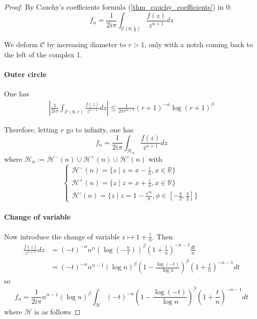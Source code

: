 \documentclass[../main.tex]{subfiles}
\begin{document}
\begin{proof}
	By Cauchy's coefficients formula (\ref{thm_cauchy_coefficients}) in 0:
	\[
	f_n = \frac{1}{2i\pi} \int_{\mathcal{C} \left(0, \frac{1}{2}\right)} \frac{f(z)}{z^{n+1}} dz
	\]
	
	We deform $\mathcal{C}$ by increasing diameter to $r > 1$, only with a notch coming back to the left of the complex 1.
	
	
	\paragraph{Outer circle}
	One has
	\begin{align*}
		\left| \frac{1}{2i\pi} \int_{\mathcal{C}(0, r)} \frac{f(z)}{z^{n+1}} dz \right| \leq
		\frac{1}{2 \pi r^{n + 1}} {(r + 1)}^{-\alpha} {\log (r + 1)}^\beta
	\end{align*}
	
	Therefore, letting $r$ go to infinity, one has
	\[
	f_n = \frac{1}{2i\pi} \int_{\mathcal{H}_n} \frac{f(z)}{z^{n+1}} dz
	\]
	where $\mathcal{H}_n := \mathcal{H}^-(n) \cup \mathcal{H}^+(n) \cup \mathcal{H}^\circ(n)$ with
	\begin{equation*}
		\begin{cases}
		\mathcal{H}^-(n) = \{z \mid z = x - \frac{i}{n}, x \in \mathbb{R} \}\\
		\mathcal{H}^+(n) = \{z \mid z = x + \frac{i}{n}, x \in \mathbb{R} \}\\
		\mathcal{H}^\circ(n) = \{z \mid z = 1 - \frac{e^{i \phi}}{n}, \phi \in [ - \frac{\pi}{2}, \frac{\pi}{2} ] \}
		\end{cases}
	\end{equation*}
	
	\paragraph{Change of variable}	
	Now introduce the change of variable $z \mapsto 1 + \frac{t}{n}$.
	Then
	\begin{align*}
	\frac{f(z)}{z^{n+1}} dz
	&= {(-t)}^{-\alpha} n^\alpha {\left( \log \left( - \frac{n}{t} \right) \right) }^\beta {\left( 1 + \frac{t}{n} \right)}^{-n-1} \frac{dt}{n}\\
	&= {(-t)}^{-\alpha} n^{\alpha-1} {(\log n)}^\beta {\left( 1 - \frac{\log (-t)}{\log n} \right)}^\beta  {\left( 1 + \frac{t}{n} \right)}^{-n-1} dt
	\end{align*}
	so
	\begin{equation*}
		f_n = \frac{1}{2i\pi} n^{\alpha - 1} {(\log n)}^\beta
		  \int_{\mathcal{H}} {(-t)}^{-\alpha} {\left( 1 - \frac{\log (-t)}{\log n} \right)}^\beta  {\left( 1 + \frac{t}{n} \right)}^{-n-1} dt
	\end{equation*}
	where $\mathcal{H}$ is as follows


\end{proof}
\end{document}
